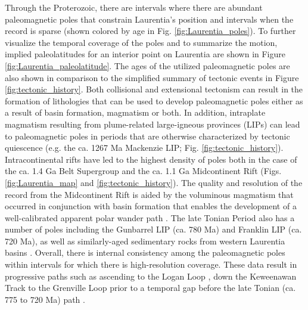 \documentclass[twocolumn, switch]{article} %
\begin{document}
Through the Proterozoic, there are intervals where there are abundant paleomagnetic poles that constrain Laurentia's position and intervals when the record is sparse (shown colored by age in Fig. \ref{fig:Laurentia_poles}). To further visualize the temporal coverage of the poles and to summarize the motion, implied paleolatitudes for an interior point on Laurentia are shown in Figure \ref{fig:Laurentia_paleolatitude}. The ages of the utilized paleomagnetic poles are also shown in comparison to the simplified summary of tectonic events in Figure \ref{fig:tectonic_history}. Both collisional and extensional tectonism can result in the formation of lithologies that can be used to develop paleomagnetic poles either as a result of basin formation, magmatism or both. In addition, intraplate magmatism resulting from plume-related large-igneous provinces (LIPs) can lead to paleomagnetic poles in periods that are otherwise characterized by tectonic quiescence (e.g. the ca. 1267 Ma Mackenzie LIP; Fig. \ref{fig:tectonic_history}). Intracontinental rifts have led to the highest density of poles both in the case of the ca. 1.4 Ga Belt Supergroup and the ca. 1.1 Ga Midcontinent Rift (Figs. \ref{fig:Laurentia_map} and \ref{fig:tectonic_history}). The quality and resolution of the record from the Midcontinent Rift is aided by the voluminous magmatism that occurred in conjunction with basin formation that enables the development of a well-calibrated apparent polar wander path \citep{Swanson-Hysell2019a}. The late Tonian Period also has a number of poles including the Gunbarrel LIP (ca. 780 Ma) and Franklin LIP (ca. 720 Ma), as well as similarly-aged sedimentary rocks from western Laurentia basins \citep{Eyster2020a}. Overall, there is internal consistency among the paleomagnetic poles within intervals for which there is high-resolution coverage. These data result in progressive paths such as ascending to the Logan Loop \citep{Robertson1971a}, down the Keweenawan Track \citep{Swanson-Hysell2019a} to the Grenville Loop \citep{McWilliams1975a} prior to a temporal gap before the late Tonian (ca. 775 to 720 Ma) path \citep{Eyster2020a}.
\end{document}
